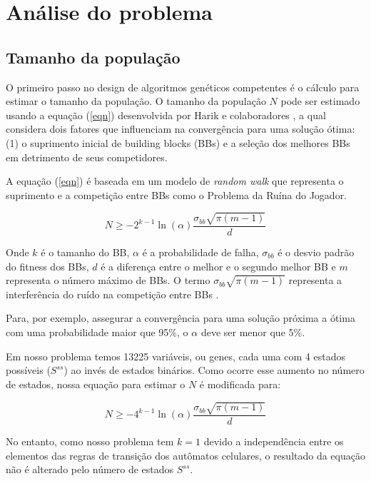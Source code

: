 \documentclass[]{scrreprt}
\begin{document}
\chapter{Análise do problema}

\section{Tamanho da população}
O primeiro passo no design de algoritmos genéticos competentes é o cálculo para estimar o tamanho da população. O tamanho da população $N$ pode ser estimado usando a equação (\ref{eqn}) desenvolvida por Harik e colaboradores \cite{Harik:1999:GRP:1326811.1326813}, a qual considera dois fatores que influenciam na convergência para uma solução ótima: (1) o suprimento inicial de building blocks (BBs) e a seleção dos melhores BBs em detrimento de seus competidores.

A equação (\ref{eqn}) é baseada em um modelo de \textit{random walk} que representa o suprimento e a competição entre BBs como o Problema da Ruína do Jogador.

\begin{equation}\label{eqn}
N \ge -2^{k-1}\ln(\alpha)\frac{\sigma_{bb}\sqrt{\pi(m-1)}}{d}
\end{equation}

Onde $k$ é o tamanho do BB, $\alpha$ é a probabilidade de falha, $\sigma_{bb}$ é o desvio padrão do fitness dos BBs, $d$ é a diferença entre o melhor e o segundo melhor BB e $m$ representa o número máximo de BBs. O termo $\sigma_{bb}\sqrt{\pi(m-1)}$ representa a interferência do ruído na competição entre BBs \cite{WRCR:WRCR8771}.

Para, por exemplo, assegurar a convergência para uma solução próxima a ótima com uma probabilidade maior que 95\%, o $\alpha$  deve ser menor que 5\%.

Em nosso problema temos 13225 variáveis, ou genes, cada uma com 4 estados possíveis ($S^{ss}$) ao invés de estados binários. Como ocorre esse aumento no número de estados, nossa equação para estimar o $N$ é modificada para:

\begin{equation}\label{eqn2}
N \ge -4^{k-1}\ln(\alpha)\frac{\sigma_{bb}\sqrt{\pi(m-1)}}{d}
\end{equation}

No entanto, como nosso problema tem $k=1$ devido a independência entre os elementos das regras de transição dos autômatos celulares, o resultado da equação não é alterado pelo número de estados $S^{ss}$.
\end{document}
